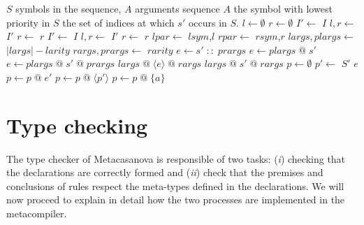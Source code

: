 \begin{algorithm}
	\small
	\caption{Parenthesization of a sequence of arguments. The operators :: and @ are respectively prepend and append on a list. With the notation $\langle S \rangle$ we denote a sequence $S$ enclosed by parentheses.}
	\label{alg:ch_metacasanova_parenthesization}
	\begin{algorithmic}
		 {$S$ symbols in the sequence, $A$ arguments sequence}
				\State \Return $A$
			\Else
					 {the symbol with lowest priority in $S$}
					 {the set of indices at which $s'$ occurs in $S$.}
					\State $l \gets \emptyset$
					\State $r \gets \emptyset$
						\State $I' \gets $   {$I$}
						\State $l,r \gets$  {$I'$}
						\State $r \gets$  {$r$}
					\Else
						\State $I' \gets $   {$I$}
						\State $l,r \gets$  {$I'$}
						\State $r \gets$  {$r$}
					\EndIf
					\State $lpar \gets$  {$lsym$,$l$}
					\State $rpar \gets$  {$rsym$,$r$}
					\State $largs,plargs \gets$  {$|largs| - larity$}
					\State $rargs,prargs \gets$  {$rarity$}
							\State $e \gets s' \; :: \; prargs$
							\State $e \gets plargs \; @ \; s'$
							\State $e \gets plargs \; @ \; s' \; @ \; prargs$
						\EndIf
						\State \Return $largs \; @ \; \langle e \rangle \; @ \; rargs$
					\Else
						\State \Return $largs \; @ \; s' \; @ \; rargs$
					\EndIf
				\Else
					\State $p \gets \emptyset$
							\State $p' \gets$  {$S'$} {$e$}
								\State $p \gets p \; @ \; e'$
							\Else
								\State $p \gets p \; @ \; \langle p' \rangle$
							\EndIf
						\Else
							\State $p \gets p \; @ \; \lbrace a \rbrace$
						\EndIf
					\EndFor
				\EndIf
			\EndIf		
		\EndFunction
	\end{algorithmic}
\end{algorithm}

\section{Type checking}
\label{sec:ch_metacasanova_type_checking}
The type checker of Metacasanova is responsible of two tasks: (\textit{i}) checking that the declarations are correctly formed and (\textit{ii}) check that the premises and conclusions of rules respect the meta-types defined in the declarations. We will now proceed to explain in detail how the two processes are implemented in the metacompiler.

